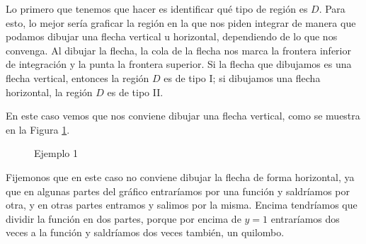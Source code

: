 \documentclass[12pt]{article}
\begin{document}
Lo primero que tenemos que hacer es identificar qué tipo de región es $ D $. Para esto, lo mejor sería graficar la región en la que nos piden integrar de manera que podamos dibujar una flecha vertical u horizontal, dependiendo de lo que nos convenga. Al dibujar la flecha, la cola de la flecha nos marca la frontera inferior de integración y la punta la frontera superior. Si la flecha que dibujamos es una flecha vertical, entonces la región $ D $ es de tipo I; si dibujamos una flecha horizontal, la región $ D $ es de tipo II.

En este caso vemos que nos conviene dibujar una flecha vertical, como se muestra en la Figura \ref{grf:regiones1}.

\begin{figure}[H]
  \centering
  {\large }
  \caption{Ejemplo 1}
  \label{grf:regiones1}
\end{figure}

Fijemonos que en este caso no conviene dibujar la flecha de forma horizontal, ya que en algunas partes del gráfico entraríamos por una función y saldríamos por otra, y en otras partes entramos y salimos por la misma. Encima tendríamos que dividir la función en dos partes, porque por encima de $ y=1 $ entraríamos dos veces a la función y saldríamos dos veces también, un quilombo.
\end{document}
